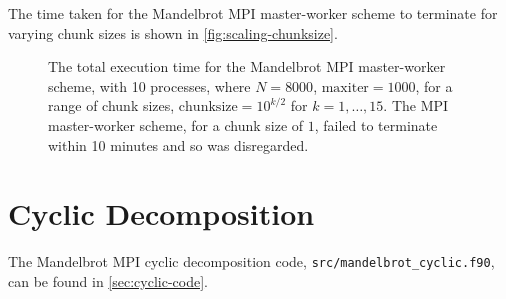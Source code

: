 \documentclass{article}
\begin{document}
The time taken for the Mandelbrot MPI master-worker scheme to terminate for
varying chunk sizes is shown in \autoref{fig:scaling-chunksize}.
\begin{figure}[h]
  \centering
  \caption{The total execution time for the Mandelbrot MPI master-worker scheme,
  with 10 processes, where $N=8000$, $\mathrm{maxiter}=1000$, for a range of
  chunk sizes, $\mathrm{chunksize} = 10^{k/2}$ for $k = 1, \dotsc, 15$. The MPI
  master-worker scheme, for a chunk size of $1$, failed to terminate within
  10 minutes and so was disregarded.}
  \label{fig:scaling-chunksize}
\end{figure}

\clearpage
\section{Cyclic Decomposition}
\label{sec:cyclic}

The Mandelbrot MPI cyclic decomposition code,
\lstinline[style=ff]{src/mandelbrot_cyclic.f90}, can be found in
\autoref{sec:cyclic-code}.

\end{document}
